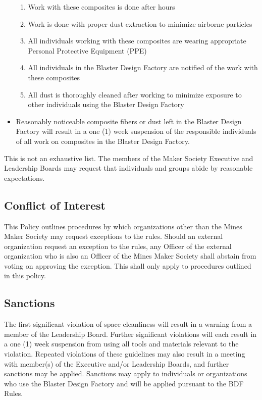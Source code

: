 \documentclass[12pt,letterpaper]{article}
\begin{document}
\begin{itemize}
    \begin{enumerate}
        \item Work with these composites is done after hours
        \item Work is done with proper dust extraction to minimize airborne particles
        \item All individuals working with these composites are wearing appropriate Personal Protective Equipment (PPE)
        \item All individuals in the Blaster Design Factory are notified of the work with these composites
        \item All dust is thoroughly cleaned after working to minimize exposure to other individuals using the Blaster Design Factory
    \end{enumerate}
    \item Reasonably noticeable composite fibers or dust left in the Blaster Design Factory will result in a one (1) week suspension of the responsible individuals of all work on composites in the Blaster Design Factory.
\end{itemize}

This is not an exhaustive list. The members of the Maker Society Executive and Leadership Boards may request that individuals and groups abide by reasonable expectations.

\subsection{Conflict of Interest}
This Policy outlines procedures by which organizations other than the Mines Maker Society may request exceptions to the rules. 
Should an external organization request an exception to the rules, 
any Officer of the external organization who is also an Officer of the Mines Maker Society shall abstain from voting on approving the exception. 
This shall only apply to procedures outlined in this policy.

\subsection{Sanctions}

The first significant violation of space cleanliness will result in a warning from a member of the Leadership Board. Further significant violations will each result in a one (1) week suspension from using all tools and materials relevant to the violation. Repeated violations of these guidelines may also result in a meeting with member(s) of the Executive and/or Leadership Boards, and further sanctions may be applied. Sanctions may apply to individuals or organizations who use the Blaster Design Factory and will be applied pursuant to the BDF Rules.
\end{document}
